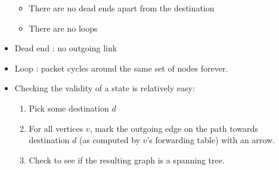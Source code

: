 \documentclass[]{article}
\providecommand{\tightlist}{%
  \setlength{\itemsep}{0pt}\setlength{\parskip}{0pt}}
\begin{document}
\begin{itemize}
  \begin{itemize}
  \tightlist
  \item
    There are no dead ends apart from the destination
  \item
    There are no loops
  \end{itemize}
\item
  Dead end : no outgoing link
\item
  Loop : packet cycles around the same set of nodes forever.
\item
  Checking the validity of a state is relatively easy:

  \begin{enumerate}
  \def\labelenumi{\arabic{enumi}.}
  \tightlist
  \item
    Pick some destination \(d\)
  \item
    For all vertices \(v\), mark the outgoing edge on the path towards
    destination \(d\) (as computed by \(v\)'s forwarding table) with an
    arrow.
  \item
    Check to see if the resulting graph is a spanning tree.
  \end{enumerate}
\end{itemize}

\href{src/routing1.png}{}

\href{src/routing2.png}{}

\href{src/routing3.png}{}

\href{src/routing4.png}{}

\href{src/routing5.png}{}
\end{document}
